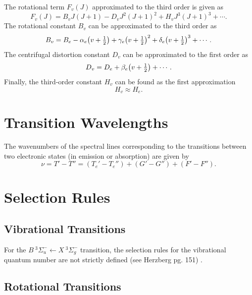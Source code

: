 \documentclass[11pt, twoside, fleqn]{report}
\DeclarePairedDelimiter\p{\lparen}{\rparen}
\begin{document}
The rotational term $F_v(J)$ approximated to the third order is given as
\begin{equation}
    F_v(J) = B_vJ(J + 1) - D_vJ^2(J + 1)^2 + H_vJ^3(J + 1)^3 + \dotsb.
\end{equation}
The rotational constant $B_v$ can be approximated to the third order as
\begin{equation*}
    B_v = B_e - \alpha_e\p*{v + \tfrac{1}{2}} + \gamma_e\p*{v + \tfrac{1}{2}}^2 + \delta_e\p*{v + \tfrac{1}{2}}^3 + \dotsb.
\end{equation*}
The centrifugal distortion constant $D_v$ can be approximated to the first order as
\begin{equation}
    D_v = D_e + \beta_e\p*{v + \tfrac{1}{2}} + \dotsb.
\end{equation}
Finally, the third-order constant $H_v$ can be found as the first approximation
\begin{equation}
    H_v \approx H_e.
\end{equation}

\section{Transition Wavelengths}
\label{s:transition_wavelengths}

The wavenumbers of the spectral lines corresponding to the transitions between two electronic states (in emission or absorption) are given by
\begin{equation}
    \nu = T' - T'' = (T_e' - T_e'') + (G' - G'') + (F' - F'').
\end{equation}

\section{Selection Rules}
\label{s:selection_rules}

\subsection{Vibrational Transitions}
\label{ss:vibrational_transitions}

For the $B~^3\Sigma_u^-\!\leftarrow\!X~^3\Sigma_g^-$ transition, the selection rules for the vibrational quantum number are not strictly defined (see Herzberg pg. 151) \cite{herzberg:spectra}.

\subsection{Rotational Transitions}
\label{ss:rotational_transitions}
\end{document}
